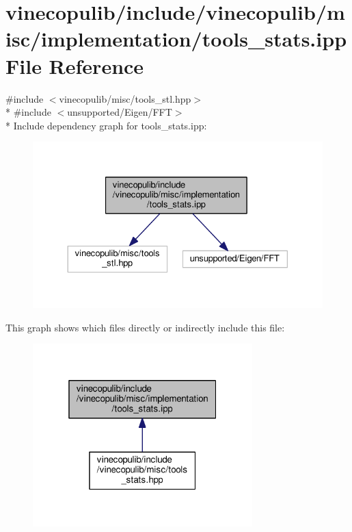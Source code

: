 \hypertarget{tools__stats_8ipp}{}\section{vinecopulib/include/vinecopulib/misc/implementation/tools\+\_\+stats.ipp File Reference}
\label{tools__stats_8ipp}
{\ttfamily \#include $<$vinecopulib/misc/tools\+\_\+stl.\+hpp$>$}\\*
{\ttfamily \#include $<$unsupported/\+Eigen/\+F\+FT$>$}\\*
Include dependency graph for tools\+\_\+stats.\+ipp\+:\nopagebreak
\begin{figure}[H]
\begin{center}
\leavevmode
\includegraphics[width=330pt]{tools__stats_8ipp__incl}
\end{center}
\end{figure}
This graph shows which files directly or indirectly include this file\+:\nopagebreak
\begin{figure}[H]
\begin{center}
\leavevmode
\includegraphics[width=241pt]{tools__stats_8ipp__dep__incl}
\end{center}
\end{figure}
